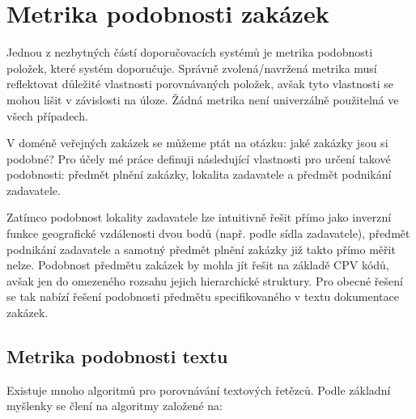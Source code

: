 \documentclass[thesis=M,czech]{FITthesis}[2019/12/23]
\begin{document}
\chapter{Metrika podobnosti zakázek}

Jednou z nezbytných částí doporučovacích systémů je metrika podobnosti položek, které systém doporučuje. Správně zvolená/navržená metrika musí reflektovat důležité vlastnosti porovnávaných položek, avšak tyto vlastnosti se mohou lišit v závislosti na úloze. Žádná metrika není univerzálně použitelná ve všech případech. 

V doméně veřejných zakázek se můžeme ptát na otázku: jaké zakázky jsou si podobné? Pro účely mé práce definuji následující vlastnosti pro určení takové podobnosti: předmět plnění zakázky, lokalita zadavatele a předmět podnikání zadavatele.

Zatímco podobnost lokality zadavatele lze intuitivně řešit přímo jako inverzní funkce geografické vzdálenosti dvou bodů (např. podle sídla zadavatele), předmět podnikání zadavatele a samotný předmět plnění zakázky již takto přímo měřit nelze. Podobnost předmětu zakázek by mohla jít řešit na základě CPV kódů, avšak jen do omezeného rozsahu jejich hierarchické struktury. Pro obecné řešení se tak nabízí řešení podobnosti předmětu specifikovaného v textu dokumentace zakázek.

\newpage
\section{Metrika podobnosti textu}
\label{sec:text_sim_metrics}

Existuje mnoho algoritmů pro porovnávání textových řetězců. Podle základní myšlenky se člení na algoritmy založené na\cite{mayank2019}:
\end{document}
